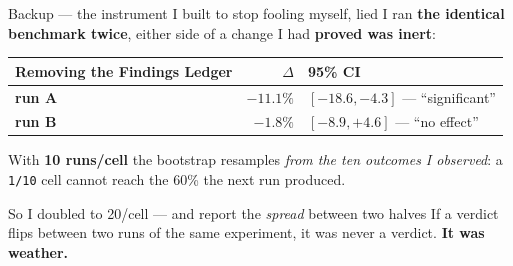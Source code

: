 \documentclass[9pt,aspectratio=169]{beamer}
\newcommand{\rd}[1]{\textcolor{unired}{\textbf{#1}}}
\newcommand{\code}[1]{\texttt{\small #1}}
\begin{document}
\begin{frame}{Backup --- the instrument I built to stop fooling myself, lied}
I ran \textbf{the identical benchmark twice}, either side of a change I had \textbf{proved was inert}:
\medskip
\centering\small
\begin{tabular}{@{}lrl@{}}
\toprule
\textbf{Removing the Findings Ledger} & \textbf{$\Delta$} & \textbf{95\% CI} \\
\midrule
\textbf{run A} & \rd{$-11.1\%$} & \rd{$[-18.6, -4.3]$} --- ``significant'' \\
\textbf{run B} & $-1.8\%$ & $[-8.9, +4.6]$ --- ``no effect'' \\
\bottomrule
\end{tabular}
\vfill
\raggedright
With \textbf{10 runs/cell} the bootstrap resamples \emph{from the ten outcomes I observed}: a \code{1/10}
cell cannot reach the 60\% the next run produced.
\medskip
\begin{alertblock}{So I doubled to 20/cell --- and report the \emph{spread} between two halves}
\centering If a verdict flips between two runs of the same experiment, it was never a verdict. \textbf{It was weather.}
\end{alertblock}
\end{frame}
\end{document}
